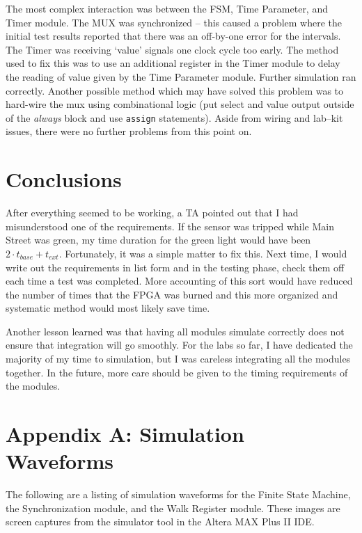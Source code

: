 \documentclass[12pt]{article}
\begin{document}
	The most complex interaction was between the FSM, Time Parameter, and
	Timer module.  The MUX was synchronized -- this caused a problem where
	the initial test results reported that there was an off-by-one error
	for the intervals.  The Timer was receiving `value' signals one clock
	cycle too early.  The method used to fix this was to use an additional
	register in the Timer module to delay the reading of value given by the
	Time Parameter module.  Further simulation ran correctly.  Another possible
	method which may have solved this problem was to hard-wire the mux using
	combinational logic (put select and value output outside of the
	\emph{always} block and use \texttt{assign} statements).  Aside from wiring
	and lab--kit issues, there were no further problems from this point on.


\section{Conclusions}
	After everything seemed to be working, a TA pointed out that I had
	misunderstood one of the requirements.  If the sensor was tripped
	while Main Street was green, my time duration for the green light would
	have been $2 \cdot t_{base} + t_{ext}$.  Fortunately, it was a simple
	matter to fix this.  Next time, I would write out the requirements in list
	form and in the testing phase, check them off each time a test was
	completed.  More accounting of this sort would have reduced the number of
	times that the FPGA was burned and this more organized and systematic
	method would most likely save time.

	Another lesson learned was that having all modules simulate correctly does
	not ensure that integration will go smoothly.  For the labs so far, I have
	dedicated the majority of my time to simulation, but I was careless
	integrating all the modules together.  In the future, more care should
	be given to the timing requirements of the modules.

\newpage
\section{Appendix A: Simulation Waveforms}
	The following are a listing of simulation waveforms for the Finite State
	Machine, the Synchronization module, and the Walk Register module.  These
	images are screen captures from the simulator tool in the Altera MAX Plus II
	IDE.
\end{document}
